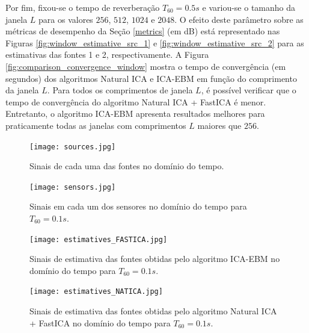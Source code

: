     Por fim, fixou-se o tempo de reverberação $T_{60}=0.5s$ e variou-se o tamanho da janela $L$ para os valores $256$, $512$, $1024$ e $2048$. O efeito deste parâmetro sobre as métricas de desempenho da Seção \ref{metrics} (em dB) está representado nas Figuras \ref{fig:window_estimative_src_1} e \ref{fig:window_estimative_src_2} para as estimativas das fontes 1 e 2, respectivamente. A Figura \ref{fig:comparison_convergence_window} mostra o tempo de convergência (em segundos) dos algoritmos Natural ICA e ICA-EBM em função do comprimento da janela $L$. Para todos os comprimentos de janela $L$, é possível verificar que o tempo de convergência do algoritmo Natural ICA + FastICA é menor. Entretanto, o algoritmo ICA-EBM apresenta resultados melhores para praticamente todas as janelas com comprimentos $L$ maiores que $256$.
    
    \begin{figure}
        \centering
        \texttt{[image: sources.jpg]}
            \caption{Sinais de cada uma das fontes no domínio do tempo.}
        \label{fig:sources}
        \texttt{[image: sensors.jpg]}
            \caption{Sinais em cada um dos sensores no domínio do tempo para $T_{60} = 0.1s$.}
        \label{fig:sensors}
    \end{figure}
    
    \begin{figure}
        \centering
        \texttt{[image: estimatives\_FASTICA.jpg]}
            \caption{Sinais de estimativa das fontes obtidas pelo algoritmo ICA-EBM no domínio do tempo para $T_{60} = 0.1s$.}
        \label{fig:icaebm}
        \texttt{[image: estimatives\_NATICA.jpg]}
            \caption{Sinais de estimativa das fontes obtidas pelo algoritmo Natural ICA + FastICA  no domínio do tempo para $T_{60} = 0.1s$.}
        \label{fig:natica}
    \end{figure}
    
